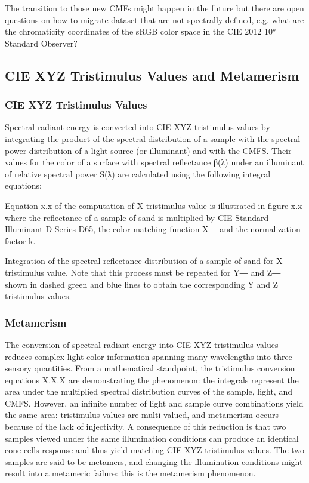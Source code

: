 The transition to those new CMFs might happen in the future but there are open questions on how to migrate dataset that are not spectrally defined, e.g. what are the chromaticity coordinates of the sRGB color space in the CIE 2012 10° Standard Observer?

\subsection{CIE XYZ Tristimulus Values and Metamerism}

\subsubsection{CIE XYZ Tristimulus Values}

Spectral radiant energy is converted into CIE XYZ tristimulus values by integrating the product of the spectral distribution of a sample with the spectral power distribution of a light source (or illuminant) and with the CMFS. Their values for the color of a surface with spectral reflectance β(λ) under an illuminant of relative spectral power S(λ) are calculated using the following integral equations:


Equation x.x of the computation of X tristimulus value is illustrated in figure x.x where the reflectance of a sample of sand is multiplied by CIE Standard Illuminant D Series D65, the color matching function X― and the normalization factor k.

Integration of the spectral reflectance distribution of a sample of sand for X tristimulus value. Note that this process must be repeated for Y― and Z― shown in dashed green and blue lines to obtain the corresponding Y and Z tristimulus values.

\subsubsection{Metamerism}

The conversion of spectral radiant energy into CIE XYZ tristimulus values reduces complex light color information spanning many wavelengths into three sensory quantities. From a mathematical standpoint, the tristimulus conversion equations X.X.X are demonstrating the phenomenon: the integrals represent the area under the multiplied spectral distribution curves of the sample, light, and CMFS. However, an infinite number of light and sample curve combinations yield the same area: tristimulus values are multi-valued, and metamerism occurs because of the lack of injectivity. A consequence of this reduction is that two samples viewed under the same illumination conditions can produce an identical cone cells response and thus yield matching CIE XYZ tristimulus values. The two samples are said to be metamers, and changing the illumination conditions might result into a metameric failure: this is the metamerism phenomenon.


